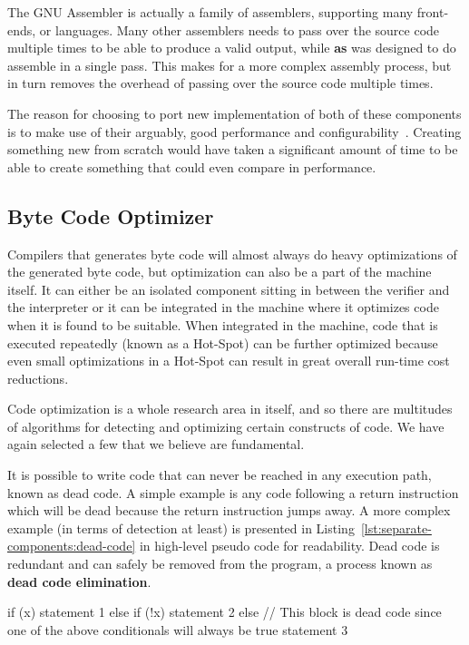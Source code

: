 The GNU Assembler is actually a family of assemblers, supporting many
front-ends, or languages. Many other assemblers needs to pass over the source
code multiple times to be able to produce a valid output, while {\bf as} was
designed to do assemble in a single pass. This makes for a more complex assembly
process, but in turn removes the overhead of passing over the source code
multiple times.

The reason for choosing to port new implementation of both of these components
is to make use of their arguably, good performance and
configurability~\cite{NEEDED}. Creating something new from scratch would have
taken a significant amount of time to be able to create something that could
even compare in performance.



\subsection{Byte Code Optimizer}

Compilers that generates byte code will almost always do heavy optimizations of
the generated byte code, but optimization can also be a part of the machine
itself. It can either be an isolated component sitting in between the verifier
and the interpreter or it can be integrated in the machine where it optimizes
code when it is found to be suitable. When integrated in the machine, code that
is executed repeatedly (known as a Hot-Spot) can be further optimized because
even small optimizations in a Hot-Spot can result in great overall run-time cost
reductions.

Code optimization is a whole research area in itself, and so there are
multitudes of algorithms for detecting and optimizing certain constructs of
code. We have again selected a few that we believe are fundamental.

It is possible to write code that can never be reached in any execution path,
known as dead code. A simple example is any code following a return instruction
which will be dead because the return instruction jumps away. A more complex
example (in terms of detection at least) is presented in
Listing~\ref{lst:separate-components:dead-code} in high-level pseudo code for
readability. Dead code is redundant and can safely be removed from the program,
a process known as \textbf{dead code elimination}.

\begin{ccode}[
  caption={Example of dead code},
  label={lst:separate-components:dead-code}]
if (x) {
  statement 1
}
else if (!x) {
  statement 2
}
else {
  // This block is dead code since one of the above conditionals will always be true
  statement 3
}
\end{ccode}

